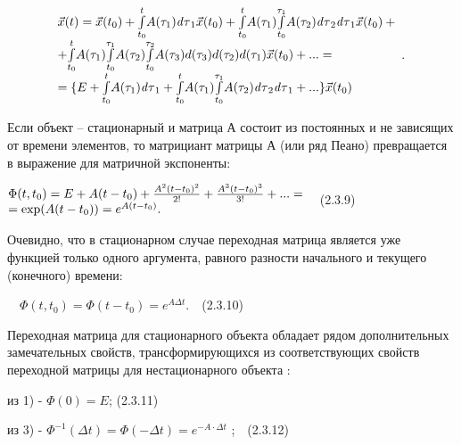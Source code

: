 \begin{equation*}
\begin{matrix}\vec x(t)=\vec x(t_0)+\overset t{\underset{t_0}{\int }}A(\tau _1)\mathit{d\tau }_1\vec x(t_0)+\overset
t{\underset{t_0}{\int }}A(\tau _1)\overset{\tau _1}{\underset{t_0}{\int }}A(\tau _2)\mathit{d\tau }_2\mathit{d\tau }_1\vec
x(t_0)+\hfill\null \\+\overset t{\underset{t_0}{\int }}A(\tau _1)\overset{\tau _1}{\underset{t_0}{\int
}}A(\tau _2)\overset{\tau _2}{\underset{t_0}{\int }}A(\tau _3)d(\tau _3)d(\tau _2)d(\tau _1)\vec x(t_0)+...=\hfill\null \\=\{E+\overset
t{\underset{t_0}{\int }}A(\tau _1)\mathit{d\tau }_1+\overset t{\underset{t_0}{\int }}A(\tau _1)\overset{\tau _1}{\underset{t_0}{\int
}}A(\tau _2)\mathit{d\tau }_2\mathit{d\tau }_1+...\}\vec x(t_0)\hfill\null \end{matrix}\;.\hfill 
\end{equation*}

		Если объект – стационарный и матрица А состоит из постоянных и не зависящих от времени элементов, то матрициант матрицы
		А (или ряд Пеано) превращается в выражение для матричной экспоненты:



		$\begin{matrix}\Phi (t,t_0)=E+A(t-t_0)+\frac{A^2(t-t_0)^2}{2!}+\frac{A^3(t-t_0)^3}{3!}+...=\hfill\null
		\\=\text{exp}(A(t-t_0))=e^{A(t-t_0)}.\hfill\null \end{matrix}\hfill $\ \ (2.3.9)



		Очевидно, что в стационарном случае переходная матрица является уже функцией только одного аргумента, равного разности
		начального и текущего (конечного) времени:



		\ \  $\Phi (t,t_0)=\Phi (t-t_0)=e^{\mathit{A\Delta t}}.$\ \ (2.3.10)



		Переходная матрица для стационарного объекта обладает рядом дополнительных замечательных свойств, трансформирующихся из
		соответствующих свойств переходной матрицы для нестационарного   объекта :



		из 1) -  $\Phi (0)=E$;  (2.3.11)



		из 3) -  $\Phi ^{-1}(\mathit{\Delta t})=\Phi (-\mathit{\Delta t})=e^{-A\cdot \mathit{\Delta t}}$ ;\ \ (2.3.12)



